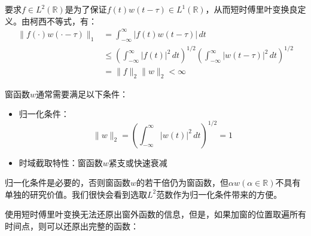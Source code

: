 要求$f\in L^2(\mathbb{R})$是为了保证$f(t)w(t-\tau)\in L^1(\mathbb{R})$，从而短时傅里叶变换良定义。由柯西不等式，有：
\begin{align*}
    \|f(\cdot) w(\cdot-\tau)\|_1&=\int_{-\infty}^{\infty}|f(t)w(t-\tau)|\,dt\\
    &\leq \left(\int_{-\infty}^{\infty}|f(t)|^2\,dt\right)^{1/2}\left(\int_{-\infty}^{\infty}|w(t-\tau)|^2\,dt\right)^{1/2}\\
    &=\|f\|_2\|w\|_2<\infty
\end{align*}

窗函数$w$通常需要满足以下条件：
\begin{itemize}
    \item 归一化条件：
    \[\|w\|_2=\left(\int_{-\infty}^{\infty}|w(t)|^2\,dt\right)^{1/2}=1\]
    \item 时域截取特性：窗函数$w$紧支或快速衰减
\end{itemize}

归一化条件是必要的，否则窗函数$w$的若干倍仍为窗函数，但$\alpha w(\alpha\in\mathbb{R})$不具有单独的研究价值。我们很快会看到选取$L^2$范数作为归一化条件带来的方便。

使用短时傅里叶变换无法还原出窗外函数的信息，但是，如果加窗的位置取遍所有时间点，则可以还原出完整的函数：

